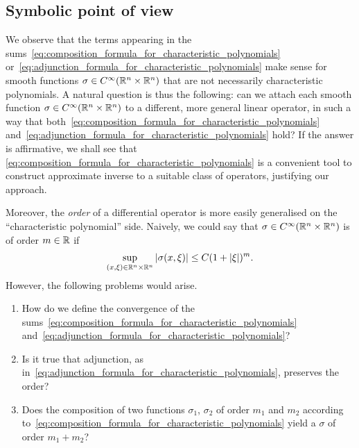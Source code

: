 \subsection{Symbolic point of view}

We observe that
the terms appearing in the sums~\eqref{eq:composition_formula_for_characteristic_polynomials} or~\eqref{eq:adjunction_formula_for_characteristic_polynomials} make sense for smooth functions $\sigma \in {C^\infty(\mathbb{R}^n \times \mathbb{R}^n)}$ that are not necessarily characteristic polynomials.
A natural question is thus the following:
can we attach each smooth function $\sigma \in {C^\infty(\mathbb{R}^n \times \mathbb{R}^n)}$ to a different, more general linear operator,
in such a way that both~\eqref{eq:composition_formula_for_characteristic_polynomials} and~\eqref{eq:adjunction_formula_for_characteristic_polynomials} hold?
If the answer is affirmative,
we shall see that
\eqref{eq:composition_formula_for_characteristic_polynomials} is a convenient tool to construct approximate inverse to a suitable class of operators,
justifying our approach.

Moreover,
the \emph{order} of a differential operator is more easily generalised on the ``characteristic polynomial'' side.
Naively, we could say that $\sigma \in {C^\infty(\mathbb{R}^n \times \mathbb{R}^n)}$ is of order $m \in \mathbb{R}$ if
\begin{align*}
    \sup_{(x, \xi) \in \mathbb{R}^n \times \mathbb{R}^n} \left|{\sigma(x, \xi)}\right| \leq C (1 + \left|{\xi}\right|)^m.
\end{align*}
However,
the following problems would arise.
\begin{enumerate}
    \item How do we define the convergence of the sums~\eqref{eq:composition_formula_for_characteristic_polynomials} and~\eqref{eq:adjunction_formula_for_characteristic_polynomials}?
    \item Is it true that adjunction, as in~\eqref{eq:adjunction_formula_for_characteristic_polynomials}, preserves the order?
    \item Does the composition of two functions $\sigma_1$, $\sigma_2$ of order $m_1$ and $m_2$ according to~\eqref{eq:composition_formula_for_characteristic_polynomials} yield a $\sigma$ of order $m_1 + m_2$?
\end{enumerate}

